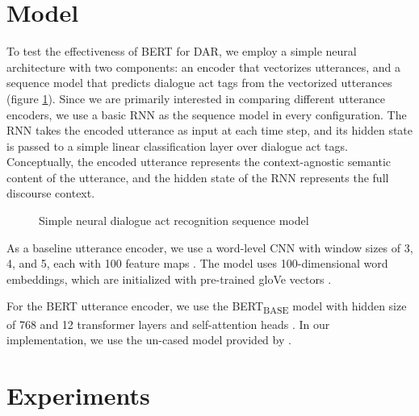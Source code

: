 \documentclass[11pt,a4paper]{article}
\begin{document}
  
\section{Model} %

To test the effectiveness of BERT for DAR, we employ a simple neural architecture with two components: an encoder that vectorizes utterances, and a sequence model that predicts dialogue act tags from the vectorized utterances (figure \ref{fig:model-architecture}).
Since we are primarily interested in comparing different utterance encoders, we use a basic RNN as the sequence model in every configuration. 
The RNN takes the encoded utterance as input at each time step,
and its hidden state is passed to a simple linear classification layer over dialogue act tags.
Conceptually, the encoded utterance represents the context-agnostic semantic content of the utterance, and the hidden state of the RNN represents the full discourse context.

\begin{figure}
  
  \caption{Simple neural dialogue act recognition sequence model}
  \label{fig:model-architecture}
\end{figure}

As a baseline utterance encoder, we use a word-level CNN with window sizes of 3, 4, and 5, each with 100 feature maps \citep{kimConvolutionalNeuralNetworks2014}. 
The model uses 100-dimensional word embeddings, which are initialized with pre-trained gloVe vectors \citep{penningtonGloveGlobalVectors2014}.

For the BERT utterance encoder, we use the BERT\textsubscript{BASE} model with hidden size of 768 and 12 transformer layers and self-attention heads \citep[][\S3.1]{devlinBERTPretrainingDeep2018}.
In our implementation, we use the un-cased model provided by \citet{wolfHuggingFaceTransformersStateoftheart2019}.

\section{Experiments}
\end{document}
